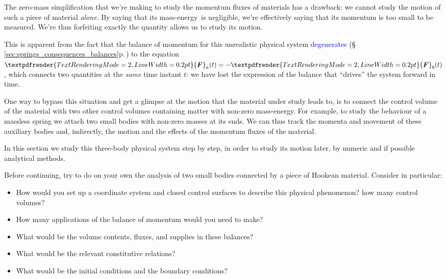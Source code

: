 \documentclass[a4paper,12pt,%
onecolumn,oneside,%
british%
]{memoir}
\renewcommand*{\bm}[1]{\textpdfrender{TextRenderingMode=2,LineWidth=0.2pt}{\boldsymbol{#1}}}
\renewcommand*{\|}[1][]{\nonscript\:#1\vert\nonscript\:\mathopen{}}
\newcommand*{\sect}{\S}%
\renewcommand*{\autoref}[3][\sect\,\ref]{\textcolor{blue}{#3} {\color{blue}\scriptsize(\faIcon[regular]{eye}\;#1{#2}\;p.\,\pageref{#2})}}
\newcommand*{\masse}{mass-energy}
\newcommand*{\yF}{\bm{F}}
\newcommand*{\yFa}{\yF_{a}}
\newcommand*{\yFb}{\yF_{b}}
\begin{document}
The zero-mass simplification that we're making to study the momentum fluxes of materials has a drawback: we cannot study the motion of such a piece of material \emph{alone}. By saying that its \masse\ is negligible, we're effectively saying that its momentum is too small to be measured. We're thus forfeiting exactly the quantity allows us to study its motion.

This is apparent from the fact that the balance of momentum for this unrealistic physical system \autoref{sec:springs_consequences_balances}{degenerates} to the equation $\yFa(t) = -\yFb(t)$, which connects two quantities at the \emph{same} time instant $t$: we have lost the expression of the balance that \enquote{drives} the system forward in time.

One way to bypass this situation and get a glimpse at the motion that the material under study leads to, is to connect the control volume of the material with two other control volumes containing matter with non-zero \masse. For example, to study the behaviour of a massless spring we attach two small bodies with non-zero masses at its ends. We can thus track the momenta and movement of these auxiliary bodies and, indirectly, the motion and the effects of the momentum fluxes of the material.

\medskip

In this section we study this three-body physical system step by step, in order to study its motion later, by numeric and if possible analytical methods.

\begin{exercise}
  Before continuing, try to do on your own the analysis of two small bodies connected by a piece of Hookean material. Consider in particular:
  \begin{itemize}
  \item How would you set up a coordinate system and closed control surfaces to describe this physical phenomenon? how many control volumes?
  \item How many applications of the balance of momentum would you need to make?
  \item What would be the volume contents, fluxes, and supplies in these balances?
  \item What would be the relevant constitutive relations?
  \item What would be the initial conditions and the boundary conditions?
  \end{itemize}
\end{exercise}
\end{document}
